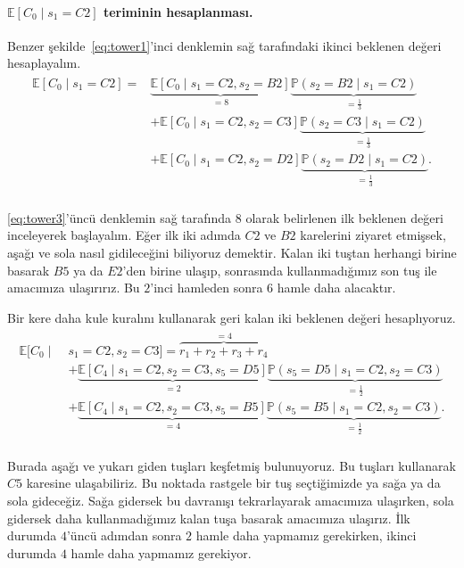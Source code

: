 \paragraph{$\mathbb{E}\left[ C_0 \mid s_1 = C2 \right]$ teriminin
hesaplanmas{\i}.} Benzer \c{s}ekilde~\eqref{eq:tower1}'inci denklemin sa\u{g}
taraf{\i}ndaki ikinci beklenen de\u{g}eri hesaplayal{\i}m. 
%
\begin{align}
    \begin{split}
    \mathbb{E}\left[ C_0 \mid s_1 = C2 \right] =
    &\underbrace{\mathbb{E}[C_0 \mid s_1 = C2, s_2 = B2]}_{=8} \underbrace{\mathbb{P}(s_2 = B2 \mid s_1 = C2)}_{=\frac{1}{3}} \\
    &+ \mathbb{E}[C_0 \mid s_1=C2, s_2 = C3] \underbrace{\mathbb{P}(s_2 = C3 \mid s_1 = C2)}_{=\frac{1}{3}} \\
    &+ \mathbb{E}[C_0 \mid s_1 = C2, s_2 = D2] \underbrace{\mathbb{P}(s_2 = D2 \mid s_1 = C2)}_{=\frac{1}{3}}.
    \end{split}
    \label{eq:tower3}
\end{align}
%
\hphantom{aha} \\[-1ex]
\eqref{eq:tower3}'\"{u}nc\"{u} denklemin sa\u{g} taraf{\i}nda $8$ olarak
belirlenen ilk beklenen de\u{g}eri inceleyerek ba\c{s}layal{\i}m. E\u{g}er ilk
iki ad{\i}mda $C2$ ve $B2$ karelerini ziyaret etmi\c{s}sek, a\c{s}a\u{g}{\i} ve
sola nas{\i}l gidilece\u{g}ini biliyoruz demektir. Kalan iki tu\c{s}tan herhangi
birine basarak $B5$ ya da $E2$'den birine ula\c{s}{\i}p, sonras{\i}nda
kullanmad{\i}\u{g}{\i}m{\i}z son tu\c{s} ile amac{\i}m{\i}za
ula\c{s}{\i}r{\i}r{\i}z. Bu $2$'inci hamleden sonra $6$ hamle daha alacakt{\i}r.

Bir kere daha kule kural{\i}n{\i} kullanarak geri kalan iki beklenen de\u{g}eri
hesapl{\i}yoruz.
%
\begin{align*}
    \begin{split}
    \mathbb{E}[C_0 \mid \; &s_1=C2, s_2=C3] = \overbrace{r_1 + r_2 + r_3 + r_4}^{=4} \\
    &+ \underbrace{\mathbb{E}[C_4 \mid s_1=C2, s_2=C3, s_5=D5]}_{=2} \underbrace{\mathbb{P}(s_5=D5 \mid s_1=C2, s_2=C3)}_{=\frac{1}{2}} \\
    &+ \underbrace{\mathbb{E}[C_4 \mid s_1=C2, s_2=C3, s_5=B5]}_{=4} \underbrace{\mathbb{P}(s_5=B5 \mid s_1=C2, s_2=C3)}_{=\frac{1}{2}}.
    \end{split}
\end{align*}
%
\hphantom{aha} \\[-2ex]
Burada a\c{s}a\u{g}{\i} ve yukar{\i} giden tu\c{s}lar{\i} ke\c{s}fetmi\c{s}
bulunuyoruz. Bu tu\c{s}lar{\i} kullanarak $C5$ karesine ula\c{s}abiliriz. Bu
noktada rastgele bir tu\c{s} se\c{c}ti\u{g}imizde ya sa\u{g}a ya da sola
gidece\u{g}iz. Sa\u{g}a gidersek bu davran{\i}\c{s}{\i} tekrarlayarak
amac{\i}m{\i}za ula\c{s}{\i}rken, sola gidersek daha
kullanmad{\i}\u{g}{\i}m{\i}z kalan tu\c{s}a basarak amac{\i}m{\i}za
ula\c{s}{\i}r{\i}z. \.{I}lk durumda $4$'\"{u}nc\"{u} ad{\i}mdan sonra $2$ hamle
daha yapmam{\i}z gerekirken, ikinci durumda $4$ hamle daha yapmam{\i}z
gerekiyor.

